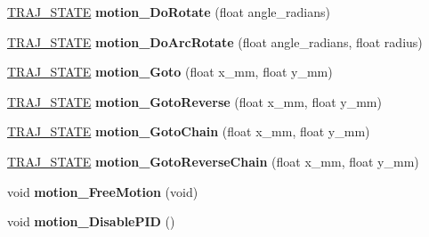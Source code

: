\begin{DoxyCompactItemize}
\item 
\mbox{\label{classAsservEsialR_a71a6761ebf937db24c35bd559cd9d836}} 
\hyperlink{path__manager_8h_adb3360abeb29758da93865c8afcb80eb}{T\+R\+A\+J\+\_\+\+S\+T\+A\+TE} {\bfseries motion\+\_\+\+Do\+Rotate} (float angle\+\_\+radians)
\item 
\mbox{\label{classAsservEsialR_a429c9c4a6008e27efe6d41ff0cb97288}} 
\hyperlink{path__manager_8h_adb3360abeb29758da93865c8afcb80eb}{T\+R\+A\+J\+\_\+\+S\+T\+A\+TE} {\bfseries motion\+\_\+\+Do\+Arc\+Rotate} (float angle\+\_\+radians, float radius)
\item 
\mbox{\label{classAsservEsialR_aff541fb741bcef0ae8be48fbf6c66d94}} 
\hyperlink{path__manager_8h_adb3360abeb29758da93865c8afcb80eb}{T\+R\+A\+J\+\_\+\+S\+T\+A\+TE} {\bfseries motion\+\_\+\+Goto} (float x\+\_\+mm, float y\+\_\+mm)
\item 
\mbox{\label{classAsservEsialR_a57df0bb16d2916c5cd161fa69034f3c8}} 
\hyperlink{path__manager_8h_adb3360abeb29758da93865c8afcb80eb}{T\+R\+A\+J\+\_\+\+S\+T\+A\+TE} {\bfseries motion\+\_\+\+Goto\+Reverse} (float x\+\_\+mm, float y\+\_\+mm)
\item 
\mbox{\label{classAsservEsialR_a85f69f82c1de14e25189941e7fb41a2b}} 
\hyperlink{path__manager_8h_adb3360abeb29758da93865c8afcb80eb}{T\+R\+A\+J\+\_\+\+S\+T\+A\+TE} {\bfseries motion\+\_\+\+Goto\+Chain} (float x\+\_\+mm, float y\+\_\+mm)
\item 
\mbox{\label{classAsservEsialR_abda7087d63c03f1a098bc1c4c117b178}} 
\hyperlink{path__manager_8h_adb3360abeb29758da93865c8afcb80eb}{T\+R\+A\+J\+\_\+\+S\+T\+A\+TE} {\bfseries motion\+\_\+\+Goto\+Reverse\+Chain} (float x\+\_\+mm, float y\+\_\+mm)
\item 
\mbox{\label{classAsservEsialR_a9f1de45d0cbdbd1d827e467b59fd4bc1}} 
void {\bfseries motion\+\_\+\+Free\+Motion} (void)
\item 
\mbox{\label{classAsservEsialR_af41648945c1353b9fc1fb07f77330646}} 
void {\bfseries motion\+\_\+\+Disable\+P\+ID} ()
\item 
\mbox{\label{classAsservEsialR_a6bcff182c51cf9de8c80f38f33267bae}} 

\end{DoxyCompactItemize}
